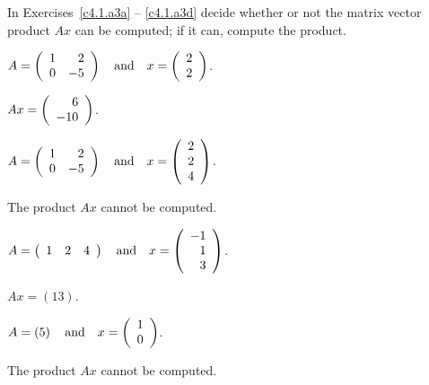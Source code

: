 \documentclass{ximera}
\begin{document}
\noindent In Exercises~\ref{c4.1.a3a} -- \ref{c4.1.a3d} decide whether or
not the matrix vector product $Ax$ can be computed; if it can, compute the
product.
\begin{exercise} \label{c4.1.a3a}
  $A=\left(\begin{array}{rr} 1 & 2\\ 0 &-5\end{array}\right) \quad\mbox{and}\quad x = \left(\begin{array}{r} 2 \\ 2\end{array}\right)$.
  
\begin{solution}
  $Ax = \left(\begin{array}{r} 6 \\ -10\end{array}\right)$.
\end{solution}

\end{exercise}

\begin{exercise} \label{c4.1.a3b}
$A=\left(\begin{array}{rr} 1 & 2\\ 0 &-5\end{array}\right) \quad\mbox{and}\quad
x = \left(\begin{array}{r} 2\\ 2 \\4\end{array}\right)$.

\begin{solution}
    The product $Ax$ cannot be computed.
\end{solution}
\end{exercise}

\begin{exercise} \label{c4.1.a3c}
$A=\left(\begin{array}{rrr} 1 & 2 & 4 \end{array}\right) \quad\mbox{and}\quad
x = \left(\begin{array}{r} -1\\ 1 \\3\end{array}\right)$.
  
\begin{solution}
    $Ax = \left(13\right)$.
    
\end{solution}
\end{exercise}

\begin{exercise} \label{c4.1.a3d}
  $A=\left(5\right) \quad\mbox{and}\quad x = \left(\begin{array}{r} 1 \\ 0\end{array}\right)$.

\begin{solution}
    The product $Ax$ cannot be computed.
\end{solution}
  
\end{exercise}
\end{document}

